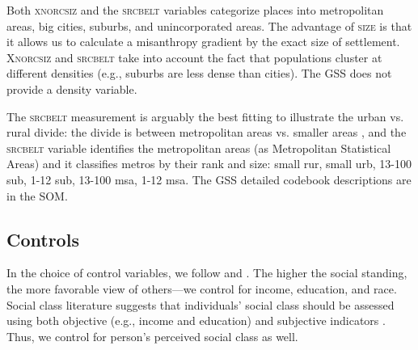 \documentclass[11pt, letterpaper]{article}
\begin{document}
\begin{spacing}{1.4}
Both \textsc{xnorcsiz} and the \textsc{srcbelt} variables categorize places into metropolitan areas, big cities, suburbs, and  unincorporated areas. The advantage of \textsc{size} is that it allows us to calculate a misanthropy 
 gradient by the exact size of settlement. \textsc{Xnorcsiz} and \textsc{srcbelt} take into account the fact that populations cluster at different densities (e.g., suburbs are less dense than cities). The GSS does not provide a density variable. 

The \textsc{srcbelt} measurement is arguably the best fitting to illustrate the
urban vs. rural divide: the divide is between metropolitan areas vs. smaller areas
\citep{hansonCityJournalautumn15}, and the \textsc{srcbelt} variable identifies the
metropolitan areas (as Metropolitan Statistical Areas) and it classifies metros
by their rank and size: small rur, small urb, 13-100 sub, 1-12 sub, 13-100 msa, 1-12 msa. The GSS detailed codebook descriptions are in the SOM. 
   

\subsection*{Controls}

In the choice of control variables, we follow \citet{welch07} and  \citet{smith97}.
The higher the social standing, the more favorable view of others---we
control for income, education, and race. Social class literature suggests that
individuals' social class should be assessed  using both objective (e.g.,
income and education) and subjective indicators \citep[e.g.,][]{kraus09}. %
Thus, we control for person's perceived social class as well. 


\end{spacing}
\end{document}
